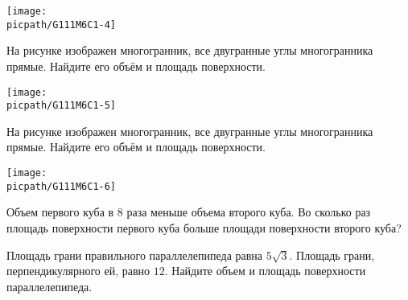 \begin{consultation}
\begin{listofex}
		\hspace{0.02\linewidth}
		\begin{minipage}[t]{\picwidth}
			\texttt{[image: \\picpath/G111M6C1-4]}
		\end{minipage}
		\item
		\begin{minipage}[t]{\bodywidth}
			На рисунке изображен многогранник, все двугранные углы многогранника прямые. Найдите его объём и площадь поверхности.
		\end{minipage}
		\hspace{0.02\linewidth}
		\begin{minipage}[t]{\picwidth}
			\texttt{[image: \\picpath/G111M6C1-5]}
		\end{minipage}
		\item
		\begin{minipage}[t]{\bodywidth}
			На рисунке изображен многогранник, все двугранные углы многогранника прямые. Найдите его объём и площадь поверхности.
		\end{minipage}
		\hspace{0.02\linewidth}
		\begin{minipage}[t]{\picwidth}
			\texttt{[image: \\picpath/G111M6C1-6]}
		\end{minipage}
		\item Объем первого куба в \( 8 \) раза меньше объема второго куба. Во сколько раз площадь поверхности первого куба больше площади поверхности второго куба?
		\item Площадь грани правильного параллелепипеда равна \( 5\sqrt{3} \). Площадь грани, перпендикулярного ей, равно \(12\). Найдите объем и площадь поверхности параллелепипеда.
	\end{listofex}
\end{consultation}

